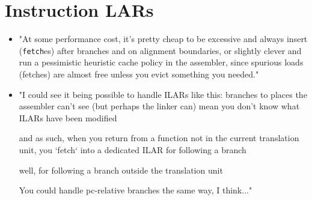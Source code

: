 \documentclass{article}
\begin{document}
\section{Instruction LARs}
	\begin{itemize}
	\item "At some performance cost, it's pretty cheap to be excessive
		and always insert (\texttt{fetch}es) after branches and on
		alignment boundaries, or slightly clever and run a pessimistic
		heuristic cache policy in the assembler, since spurious loads
		(fetches) are almost free unless you evict something you
		needed."
	\item "I could see it being possible to handle ILARs like this:
		branches to places the assembler can't see (but perhaps the
		linker can) mean you don't know what ILARs have been modified

		and as such, when you return from a function not in the current
		translation unit, you `fetch` into a dedicated ILAR for
		following a branch

		well, for following a branch outside the translation unit

		You could handle pc-relative branches the same way, I think..."
	\end{itemize}
\end{document}
